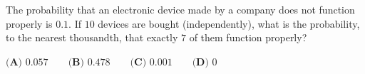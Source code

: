 The probability that an electronic device made by a company does not function properly is $0.1$. If $10$ devices are bought (independently), what is the probability, to the nearest thousandth, that exactly $7$ of them function properly?

$\textbf{(A) } 0.057\qquad\textbf{(B) } 0.478\qquad\textbf{(C) } 0.001\qquad\textbf{(D) } 0$
